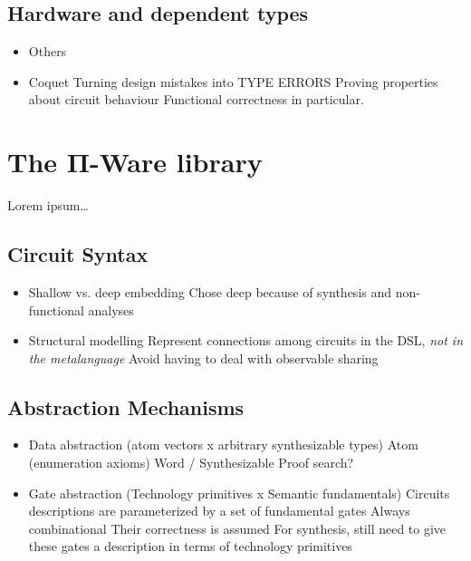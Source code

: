 \documentclass[a4paper]{article}
\begin{document}
        \subsection{Hardware and dependent types}
        \label{subsec:hardware-dtp}
            \begin{itemize}
                \item Others
                \item Coquet
                    \subitem Turning design mistakes into TYPE ERRORS
                    \subitem Proving properties about circuit behaviour
                    \subsubitem Functional correctness in particular.
            \end{itemize}


    \section{The Π-Ware library}
    \label{sec:piware}
        Lorem ipsum\ldots


        \subsection{Circuit Syntax}
        \label{subsec:circuit-types}
            \begin{itemize}
                \item Shallow vs. deep embedding
                    \subitem Chose deep because of synthesis and non-functional analyses
                \item Structural modelling
                    \subitem Represent connections among circuits in the DSL, \emph{not in the metalanguage}
                    \subitem Avoid having to deal with observable sharing
            \end{itemize}

        \subsection{Abstraction Mechanisms}
        \label{subsec:abstraction}
            \begin{itemize}
                \item Data abstraction (atom vectors x arbitrary synthesizable types)
                    \subitem Atom (enumeration axioms)
                    \subitem Word / Synthesizable
                        \subsubitem Proof search?
                \item Gate abstraction (Technology primitives x Semantic fundamentals)
                    \subitem Circuits descriptions are parameterized by a set of fundamental gates
                        \subsubitem Always combinational
                        \subsubitem Their correctness is assumed
                    \subitem For synthesis, still need to give these gates a description in terms of technology primitives
            \end{itemize}
\end{document}
